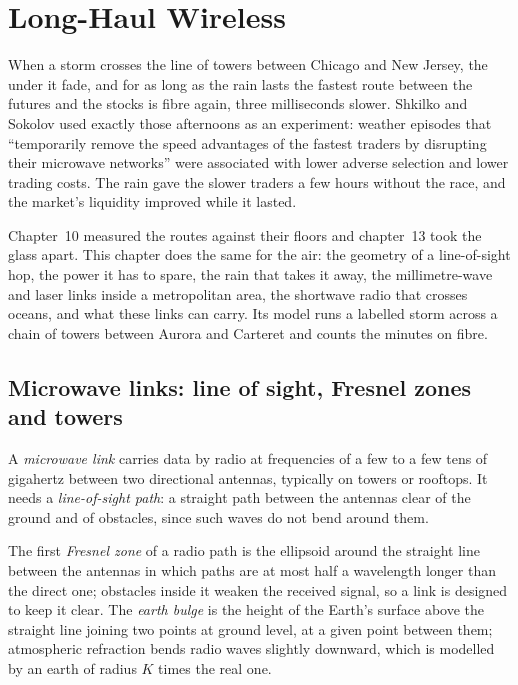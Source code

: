 \chapter{Long-Haul Wireless}\label{ch:nw:long-haul-wireless}

When a storm crosses the line of towers between Chicago and New Jersey, the  under it fade, and for as long as the rain
lasts the fastest route between the futures and the stocks is fibre again, three milliseconds slower. Shkilko and Sokolov used exactly
those afternoons as an experiment: weather episodes that ``temporarily remove the speed advantages of the fastest traders by disrupting
their microwave networks'' were associated with lower adverse selection and lower trading costs. The rain gave the slower traders a few
hours without the race, and the market's liquidity improved while it lasted.

Chapter~10 measured the routes against their floors and chapter~13 took the glass apart. This chapter does the same for the air: the geometry
of a line-of-sight hop, the power it has to spare, the rain that takes it away, the millimetre-wave and laser links inside a metropolitan
area, the shortwave radio that crosses oceans, and what these links can carry. Its model runs a labelled storm across a chain of towers
between Aurora and Carteret and counts the minutes on fibre.

\section{Microwave links: line of sight, Fresnel zones and towers}

\begin{definition}\label{def:nw:long-haul-wireless:mw}
A \emph{microwave link} carries data by radio at frequencies of a few to a few tens of gigahertz between two directional
antennas, typically on towers or rooftops. It needs a \emph{line-of-sight path}: a straight path between the antennas
clear of the ground and of obstacles, since such waves do not bend around them.
\end{definition}

\begin{definition}\label{def:nw:long-haul-wireless:fresnel}
The first \emph{Fresnel zone} of a radio path is the ellipsoid around the straight line between the antennas in which
paths are at most half a wavelength longer than the direct one; obstacles inside it weaken the received signal, so a link is designed to keep
it clear. The \emph{earth bulge} is the height of the Earth's surface above the straight line joining two points at ground
level, at a given point between them; atmospheric refraction bends radio waves slightly downward, which is modelled by an earth of radius
$K$ times the real one.
\end{definition}

